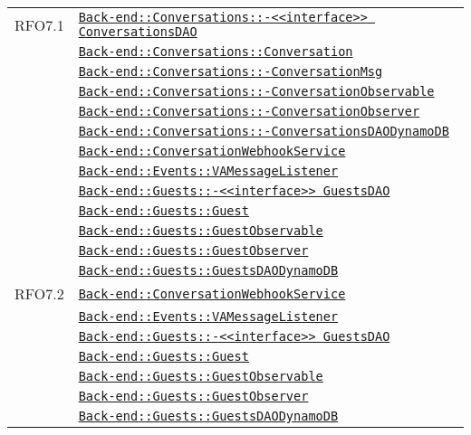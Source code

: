 \begin{longtable}{|>{\centering}m{3cm}|m{10cm}<{\centering}|}
RFO7.1 & \hyperref[Back-end::Conversations::<<interface>> ConversationsDAO]{\texttt{Back-end::Conversations::-\linebreak <<interface>> ConversationsDAO}}\\
& \hyperref[Back-end::Conversations::Conversation]{\texttt{Back-end::Conversations::Conversation}}\\
& \hyperref[Back-end::Conversations::ConversationMsg]{\texttt{Back-end::Conversations::-\linebreak ConversationMsg}}\\
& \hyperref[Back-end::Conversations::ConversationObservable]{\texttt{Back-end::Conversations::-\linebreak ConversationObservable}}\\
& \hyperref[Back-end::Conversations::ConversationObserver]{\texttt{Back-end::Conversations::-\linebreak ConversationObserver}}\\
& \hyperref[Back-end::Conversations::ConversationsDAODynamoDB]{\texttt{Back-end::Conversations::-\linebreak ConversationsDAODynamoDB}}\\
& \hyperref[Back-end::ConversationWebhookService]{\texttt{Back-end::ConversationWebhookService}}\\
& \hyperref[Back-end::Events::VAMessageListener]{\texttt{Back-end::Events::VAMessageListener}}\\
& \hyperref[Back-end::Guests::<<interface>> GuestsDAO]{\texttt{Back-end::Guests::-\linebreak <<interface>> GuestsDAO}}\\
& \hyperref[Back-end::Guests::Guest]{\texttt{Back-end::Guests::Guest}}\\
& \hyperref[Back-end::Guests::GuestObservable]{\texttt{Back-end::Guests::GuestObservable}}\\
& \hyperref[Back-end::Guests::GuestObserver]{\texttt{Back-end::Guests::GuestObserver}}\\
& \hyperref[Back-end::Guests::GuestsDAODynamoDB]{\texttt{Back-end::Guests::GuestsDAODynamoDB}}\\ \hline

RFO7.2 & \hyperref[Back-end::ConversationWebhookService]{\texttt{Back-end::ConversationWebhookService}}\\
& \hyperref[Back-end::Events::VAMessageListener]{\texttt{Back-end::Events::VAMessageListener}}\\
& \hyperref[Back-end::Guests::<<interface>> GuestsDAO]{\texttt{Back-end::Guests::-\linebreak <<interface>> GuestsDAO}}\\
& \hyperref[Back-end::Guests::Guest]{\texttt{Back-end::Guests::Guest}}\\
& \hyperref[Back-end::Guests::GuestObservable]{\texttt{Back-end::Guests::GuestObservable}}\\
& \hyperref[Back-end::Guests::GuestObserver]{\texttt{Back-end::Guests::GuestObserver}}\\
& \hyperref[Back-end::Guests::GuestsDAODynamoDB]{\texttt{Back-end::Guests::GuestsDAODynamoDB}}\\ \hline


\end{longtable}
